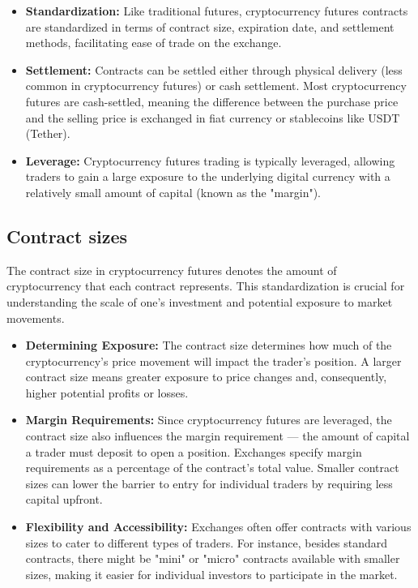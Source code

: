 \documentclass{report}
\begin{document}
    \bigbreak \noindent 
    \bigbreak \noindent 
    \begin{itemize}
        \item \textbf{Standardization:} Like traditional futures, cryptocurrency futures contracts are standardized in terms of contract size, expiration date, and settlement methods, facilitating ease of trade on the exchange.
        \item \textbf{Settlement:} Contracts can be settled either through physical delivery (less common in cryptocurrency futures) or cash settlement. Most cryptocurrency futures are cash-settled, meaning the difference between the purchase price and the selling price is exchanged in fiat currency or stablecoins like USDT (Tether).
        \item \textbf{Leverage:} Cryptocurrency futures trading is typically leveraged, allowing traders to gain a large exposure to the underlying digital currency with a relatively small amount of capital (known as the "margin").
    \end{itemize}
    \bigbreak \noindent 
    \subsection{Contract sizes}
    \bigbreak \noindent 
    The contract size in cryptocurrency futures denotes the amount of cryptocurrency that each contract represents. This standardization is crucial for understanding the scale of one’s investment and potential exposure to market movements.
    \bigbreak \noindent 
    \begin{itemize}
        \item \textbf{Determining Exposure:} The contract size determines how much of the cryptocurrency's price movement will impact the trader’s position. A larger contract size means greater exposure to price changes and, consequently, higher potential profits or losses.
        \item \textbf{Margin Requirements:} Since cryptocurrency futures are leveraged, the contract size also influences the margin requirement — the amount of capital a trader must deposit to open a position. Exchanges specify margin requirements as a percentage of the contract's total value. Smaller contract sizes can lower the barrier to entry for individual traders by requiring less capital upfront.
        \item \textbf{Flexibility and Accessibility:} Exchanges often offer contracts with various sizes to cater to different types of traders. For instance, besides standard contracts, there might be "mini" or "micro" contracts available with smaller sizes, making it easier for individual investors to participate in the market.
    \end{itemize}
    \bigbreak \noindent 
\end{document}
